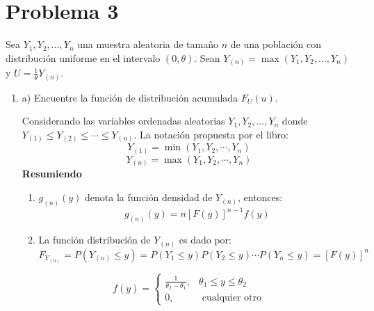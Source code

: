 \section{Problema 3}
Sea $Y_{1}, Y_{2}, \ldots, Y_{n}$ una muestra aleatoria de tamaño $n$ de una población con distribución uniforme en el intervalo $(0, \theta) .$ Sean $Y_{(n)}=\max\left(Y_{1}, Y_{2}, \ldots, Y_{n}\right)$ y $U=\frac{1}{\theta} Y_{(n)}$.
\begin{enumerate}
\item a) Encuentre la función de distribución acumulada $F_{U}(u)$.
\begin{tcolorbox}[colback=gray!15,colframe=purple!10!purple,title=Sección 6.7 - Estadísticos de Orden (Order Statistics)]
   Considerando las variables ordenadas aleatorias $Y_1,Y_2,...,Y_n$ donde $Y_{(1)}\leq Y_{(2)}\leq\cdots\leq Y_{(n)}$. La notación propuesta por el libro: 
   $$Y_{(1)}=\min (Y_1,Y_2,\cdots, Y_n)$$
   $$Y_{(n)}=\max (Y_1,Y_2,\cdots, Y_n)$$
   \textbf{Resumiendo}
   \begin{enumerate}
       \item $g_{(n)}(y)$ denota la función densidad de $Y_{(n)}$, entonces:
   $$g_{(n)}(y)=n\left[F(y)\right]^{n-1}f(y)$$
        \item La función distribución de $Y_{(n)}$ es dado por: 
        $$F_{Y_{(n)}}=P(Y_{(n)}\leq y)=P(Y_1\leq y)P(Y_2\leq y)\cdots P(Y_n\leq y)=[F(y)]^n$$
   \end{enumerate}
    \end{tcolorbox}
\begin{tcolorbox}[colback=gray!15,colframe=blue!10!blue,title=Definición 4.6 - Distribución Uniforme-Densidad]
$$f(y)= \begin{cases}\frac{1}{\theta_2-\theta_1}, & \theta_1\leq y\leq \theta_2\\ 0, &\text{ cualquier otro}\end{cases}$$
    \end{tcolorbox}
    


\end{enumerate}
